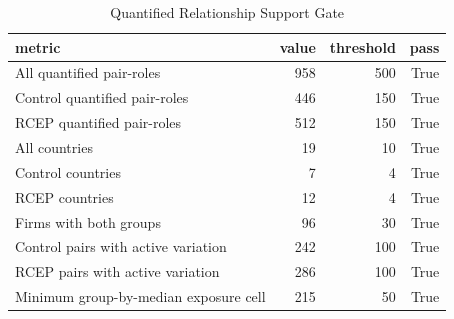 \begin{table}
\caption{Quantified Relationship Support Gate}
\label{tab:table1_support_gate}
\begin{tabular}{lrrr}
\toprule
metric & value & threshold & pass \\
\midrule
All quantified pair-roles & 958 & 500 & True \\
Control quantified pair-roles & 446 & 150 & True \\
RCEP quantified pair-roles & 512 & 150 & True \\
All countries & 19 & 10 & True \\
Control countries & 7 & 4 & True \\
RCEP countries & 12 & 4 & True \\
Firms with both groups & 96 & 30 & True \\
Control pairs with active variation & 242 & 100 & True \\
RCEP pairs with active variation & 286 & 100 & True \\
Minimum group-by-median exposure cell & 215 & 50 & True \\
\bottomrule
\end{tabular}
\end{table}
